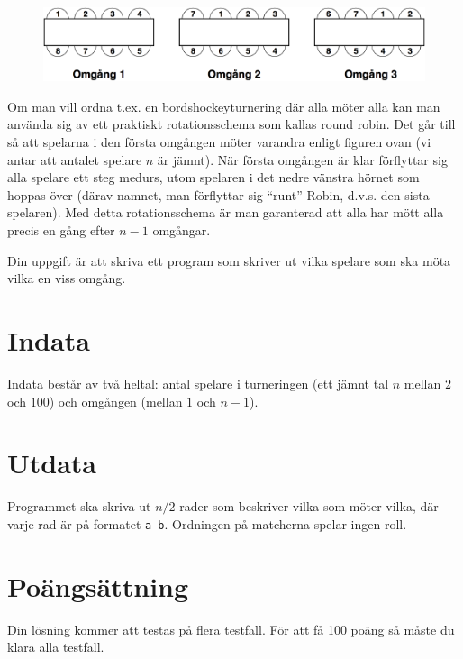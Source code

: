 
\begin{figure}[h!]
  \centering
  \includegraphics{turnering.png}
\end{figure}

Om man vill ordna t.ex. en bordshockeyturnering där alla möter alla kan man använda sig av ett praktiskt rotationsschema som kallas round robin.
Det går till så att spelarna i den första omgången möter varandra enligt figuren ovan (vi antar att antalet spelare $n$ är jämnt).
När första omgången är klar förflyttar sig alla spelare ett steg medurs, utom spelaren i det nedre vänstra hörnet som hoppas över (därav namnet, man förflyttar sig ``runt'' Robin, d.v.s. den sista spelaren).
Med detta rotationsschema är man garanterad att alla har mött alla precis en gång efter $n-1$ omgångar.

Din uppgift är att skriva ett program som skriver ut vilka spelare som ska möta vilka en viss omgång.

\section*{Indata}
Indata består av två heltal: antal spelare i turneringen (ett jämnt tal $n$ mellan $2$ och $100$) och omgången (mellan $1$ och $n-1$).

\section*{Utdata}
Programmet ska skriva ut $n/2$ rader som beskriver vilka som möter vilka, där varje rad är på formatet \texttt{a-b}.
Ordningen på matcherna spelar ingen roll.

\section*{Poängsättning}
Din lösning kommer att testas på flera testfall. För att få 100 poäng så måste du klara alla testfall.
